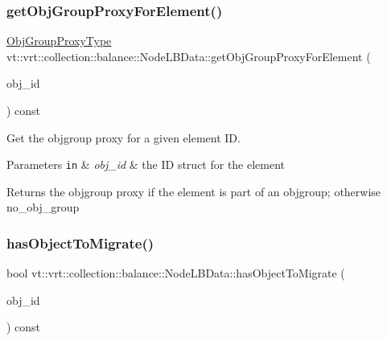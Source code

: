 \subsubsection{\texorpdfstring{get\+Obj\+Group\+Proxy\+For\+Element()}{getObjGroupProxyForElement()}}
{\footnotesize\ttfamily \hyperlink{namespacevt_ad7cae989df485fccca57f0792a880a8e}{Obj\+Group\+Proxy\+Type} vt\+::vrt\+::collection\+::balance\+::\+Node\+L\+B\+Data\+::get\+Obj\+Group\+Proxy\+For\+Element (\begin{DoxyParamCaption}\item[{\hyperlink{namespacevt_1_1vrt_1_1collection_1_1balance_a9f5b53fafb270212279a4757d2c4cd28}{Element\+I\+D\+Struct}}]{obj\+\_\+id }\end{DoxyParamCaption}) const}



Get the objgroup proxy for a given element ID. 


\begin{DoxyParams}[1]{Parameters}
\mbox{\tt in}  & {\em obj\+\_\+id} & the ID struct for the element\\
\hline
\end{DoxyParams}
\begin{DoxyReturn}{Returns}
the objgroup proxy if the element is part of an objgroup; otherwise {\ttfamily no\+\_\+obj\+\_\+group} 
\end{DoxyReturn}
\mbox{\label{structvt_1_1vrt_1_1collection_1_1balance_1_1_node_l_b_data_af025247a42d9b3ff6ba476714aad42fa}} 
\subsubsection{\texorpdfstring{has\+Object\+To\+Migrate()}{hasObjectToMigrate()}}
{\footnotesize\ttfamily bool vt\+::vrt\+::collection\+::balance\+::\+Node\+L\+B\+Data\+::has\+Object\+To\+Migrate (\begin{DoxyParamCaption}\item[{\hyperlink{namespacevt_1_1vrt_1_1collection_1_1balance_a9f5b53fafb270212279a4757d2c4cd28}{Element\+I\+D\+Struct}}]{obj\+\_\+id }\end{DoxyParamCaption}) const}



